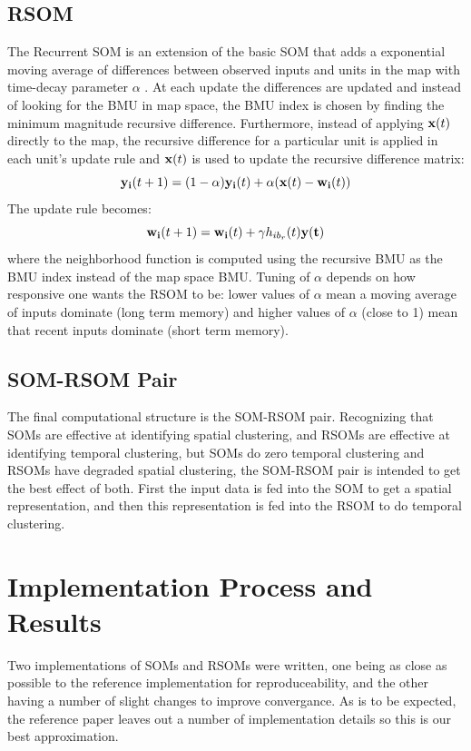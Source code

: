 \documentclass[a4paper,10pt]{article}
\begin{document}
\subsection{RSOM}
The Recurrent SOM is an extension of the basic SOM that adds a exponential moving average of
differences between observed inputs and units in the map with time-decay parameter $\alpha$ . At
each update the differences are updated and instead of looking for the BMU in map space, the BMU
index is chosen by finding the minimum magnitude recursive difference. Furthermore, instead of
applying $\bold{x}(t)$ directly to the map, the recursive difference for a particular unit is
applied in each unit's update rule and $\bold{x}(t)$ is used to update the recursive difference
matrix:
\begin{equation}
 \bold{y_i}(t+1) = (1-\alpha)\bold{y_i}(t)+\alpha(\bold{x}(t)-\bold{w_i}(t))
\end{equation}
The update rule becomes:
 \begin{equation} \label{eq:RUPDATE}
 \bold{w_{i}}(t+1) = \bold{w_i}(t) + \gamma h_{ib_r}(t)\bold{y(t)}
\end{equation}
where the neighborhood function is computed using the recursive BMU as the BMU index instead of the
map space BMU.  Tuning of $\alpha$ depends on how responsive one wants the RSOM to be: lower values
of $\alpha$ mean a moving average of inputs dominate (long term memory) and higher values of
$\alpha$ (close to 1) mean that recent inputs dominate (short term memory).
\subsection{SOM-RSOM Pair}
The final computational structure is the SOM-RSOM pair.  Recognizing that SOMs are effective at
identifying spatial clustering, and RSOMs are effective at identifying temporal clustering, but
SOMs do zero temporal clustering and RSOMs have degraded spatial clustering, the SOM-RSOM pair is
intended to get the best effect of both.  First the input data is fed into the SOM to get a spatial
representation, and then this representation is fed into the RSOM to do temporal clustering. 
\section{Implementation Process and Results}
Two implementations of SOMs and RSOMs were written, one being as close as possible
to the reference implementation for reproduceability, and the other having a number of slight
changes to improve convergance.  As is to be expected, the reference paper leaves out a
number of implementation details so this is our best approximation.
\end{document}
